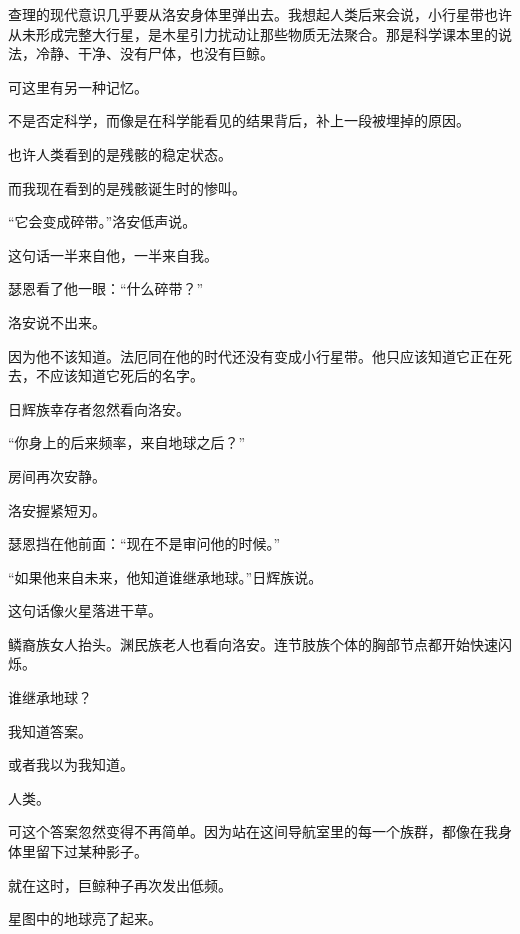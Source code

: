 查理的现代意识几乎要从洛安身体里弹出去。我想起人类后来会说，小行星带也许从未形成完整大行星，是木星引力扰动让那些物质无法聚合。那是科学课本里的说法，冷静、干净、没有尸体，也没有巨鲸。

可这里有另一种记忆。

不是否定科学，而像是在科学能看见的结果背后，补上一段被埋掉的原因。

也许人类看到的是残骸的稳定状态。

而我现在看到的是残骸诞生时的惨叫。

“它会变成碎带。”洛安低声说。

这句话一半来自他，一半来自我。

瑟恩看了他一眼：“什么碎带？”

洛安说不出来。

因为他不该知道。法厄同在他的时代还没有变成小行星带。他只应该知道它正在死去，不应该知道它死后的名字。

日辉族幸存者忽然看向洛安。

“你身上的后来频率，来自地球之后？”

房间再次安静。

洛安握紧短刃。

瑟恩挡在他前面：“现在不是审问他的时候。”

“如果他来自未来，他知道谁继承地球。”日辉族说。

这句话像火星落进干草。

鳞裔族女人抬头。渊民族老人也看向洛安。连节肢族个体的胸部节点都开始快速闪烁。

谁继承地球？

我知道答案。

或者我以为我知道。

人类。

可这个答案忽然变得不再简单。因为站在这间导航室里的每一个族群，都像在我身体里留下过某种影子。

就在这时，巨鲸种子再次发出低频。

星图中的地球亮了起来。
